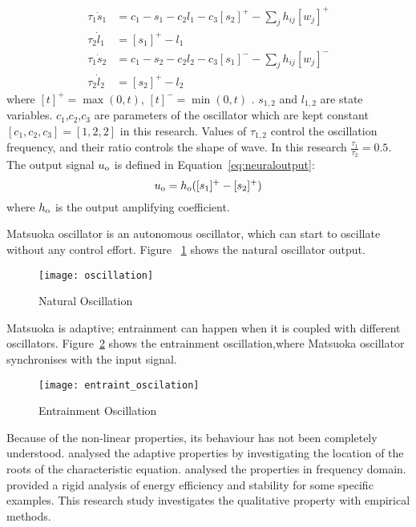 \begin{align}
\tau_{1} \dot{s}_{1}&=c_1-s_{1}-c_2 l_{1}-c_3 [s_{2}]^{+}-\sum_{j}h_{ij}[w_{j}]^{+} \nonumber\\
\tau_{2} \dot{l}_{1}&=[s_{1}]^{+}-l_{1} \nonumber\\
\tau_{1} \dot{s}_{2}&=c_1-s_{2}-c_2 l_{2}-c_3 [s_{1}]^{-}-\sum_{j}h_{ij}[w_{j}]^{-} \nonumber\\
\tau_{2} \dot{l}_{2}&=[s_{2}]^{+}-l_{2}
\label{eq:matsuta}
\end{align}
where $[t]^{+}=\max(0,t)$, $[t]^{-}=\min(0,t)$ .
$s_{1,2}$ and $l_{1,2}$ are state variables.
$c_1$,$c_2$,$c_3$ are parameters of the oscillator which are kept constant$[c_1,c_2,c_3]=[1,2,2]$ in this research.
Values of $\tau_{1,2}$ control the oscillation frequency, and their ratio controls the shape of wave.
In this research $\frac{\tau_{1}}{\tau_{2}}=0.5$.
The output signal $u_{\mathrm{o}}$ is defined in Equation~\ref{eq:neuraloutput}:
\begin{equation}
u_{\mathrm{o}}=h_{\mathrm{o}}([s_{1}]^{+}-[s_{2}]^{+})
\label{eq:neuraloutput}
\end{equation}
where $h_{\mathrm{o}}$ is the output amplifying coefficient.

Matsuoka oscillator is an autonomous oscillator, which can start to oscillate without any control effort.
Figure ~\ref{fig:natural-oscillation} shows the natural oscillator output.
\begin{figure}[h]
\begin{center}
\texttt{[image: oscillation]}
\caption{Natural Oscillation}
\label{fig:natural-oscillation}
\end{center}
\end{figure}





Matsuoka is adaptive; entrainment can happen when it is coupled with different oscillators. 
Figure~\ref{fig:entraint-oscillation} shows the entrainment oscillation,where  Matsuoka oscillator synchronises with the input signal.
\begin{figure}[h]
\begin{center}
\texttt{[image: entraint\_oscilation]}
\caption{Entrainment Oscillation}
\label{fig:entraint-oscillation}
\end{center}
\end{figure}

Because of the non-linear properties, its behaviour has not been completely understood. 
\citet{Matsuoka1987} analysed the adaptive properties by investigating the location of the roots of the characteristic equation. 
\citet{Williamson1998} analysed the properties in frequency domain.
\citet{futakataentrainment} provided a rigid analysis of energy efficiency and stability for some specific examples.
This research study investigates the qualitative property with  empirical methods.

